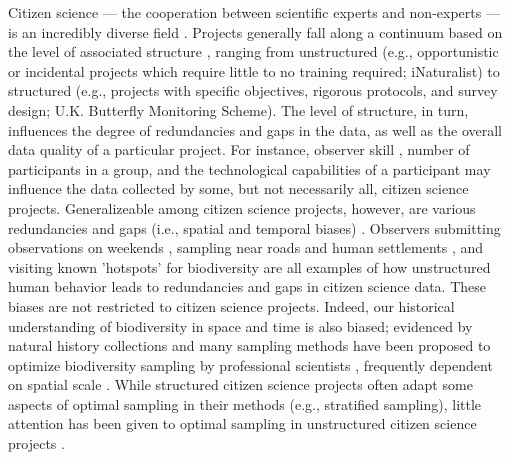 \documentclass[9pt,twocolumn,twoside,lineno]{pnas-new}
\begin{document}
Citizen science --- the cooperation between scientific experts and non-experts  --- is an incredibly diverse field \cite{jordan2015citizen}. Projects generally fall along a continuum based on the level of associated structure \cite{kelling2019using, welvaert2016citizen}, ranging from unstructured (e.g., opportunistic or incidental projects which require little to no training required; iNaturalist) to structured (e.g., projects with specific objectives, rigorous protocols, and survey design; U.K. Butterfly Monitoring Scheme). The level of structure, in turn, influences the degree of redundancies and gaps in the data, as well as the overall data quality of a particular project. For instance, observer skill \cite{kelling2015can}, number of participants in a group, and the technological capabilities of a participant may influence the data collected by some, but not necessarily all, citizen science projects. Generalizeable among citizen science projects, however, are various redundancies and gaps (i.e., spatial and temporal biases) \cite{boakes2010distorted, bird2014statistical}. Observers submitting observations on weekends \cite{courter2013weekend}, sampling near roads and human settlements \cite{kelling2015taking}, and visiting known 'hotspots' for biodiversity \cite{geldmann2016determines} are all examples of how unstructured human behavior leads to redundancies and gaps in citizen science data. These biases are not restricted to citizen science projects. Indeed, our historical understanding of biodiversity in space and time is also biased; evidenced by natural history collections \cite{pyke2010biological, boakes2010distorted} and many sampling methods have been proposed to optimize biodiversity sampling by professional scientists \cite{etienne2005new, moreno2000assessing, colwell1994estimating, longino1997biodiversity, ferrarini2012biodiversity}, frequently dependent on spatial scale \cite{chase2013scale}. While structured citizen science projects often adapt some aspects of optimal sampling in their methods (e.g., stratified sampling), little attention has been given to optimal sampling in unstructured citizen science projects \cite{harrison2014assessing}.
\end{document}
